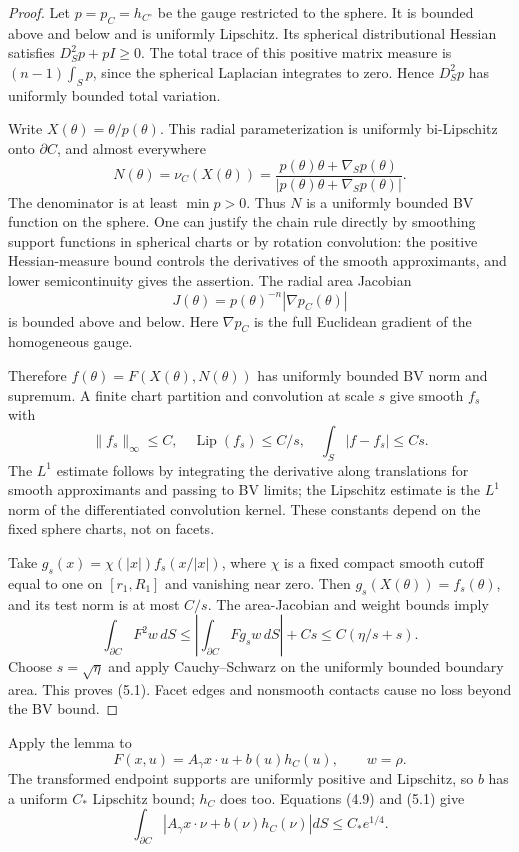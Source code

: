 \documentclass[11pt,reqno]{amsart}
\numberwithin{equation}{section}
\theoremstyle{remark}
\theoremstyle{definition}
\begin{document}
\begin{proof} Let \(p=p_C=h_{C^\circ}\) be the gauge restricted to the sphere. It is bounded above and below and is uniformly Lipschitz. Its spherical distributional Hessian satisfies
\(D_S^2p+pI\ge0\). The total trace of this positive matrix measure is
\((n-1)\int_Sp\), since the spherical Laplacian integrates to zero. Hence \(D_S^2p\) has uniformly bounded total variation.

Write \(X(\theta)=\theta/p(\theta)\). This radial parameterization is uniformly bi-Lipschitz onto \(\partial C\), and almost everywhere
\[
N(\theta)=\nu_C(X(\theta))
=\frac{p(\theta)\theta+\nabla_Sp(\theta)}
       {|p(\theta)\theta+\nabla_Sp(\theta)|}.
\]
The denominator is at least \(\min p>0\). Thus \(N\) is a uniformly bounded BV function on the sphere. One can justify the chain rule directly by smoothing support functions in spherical charts or by rotation convolution: the positive Hessian-measure bound controls the derivatives of the smooth approximants, and lower semicontinuity gives the assertion. The radial area Jacobian
\[
J(\theta)=p(\theta)^{-n}|\nabla p_C(\theta)|
\]
is bounded above and below. Here $\nabla p_C$ is the full Euclidean gradient of the homogeneous gauge.

Therefore \(f(\theta)=F(X(\theta),N(\theta))\) has uniformly bounded BV norm and supremum. A finite chart partition and convolution at scale \(s\) give smooth \(f_s\) with
\[
\|f_s\|_\infty\le C,\quad \operatorname{Lip}(f_s)\le C/s,\quad
\int_S|f-f_s|\le Cs.
\]
The \(L^1\) estimate follows by integrating the derivative along translations for smooth approximants and passing to BV limits; the Lipschitz estimate is the \(L^1\) norm of the differentiated convolution kernel. These constants depend on the fixed sphere charts, not on facets.

Take \(g_s(x)=\chi(|x|)f_s(x/|x|)\), where \(\chi\) is a fixed compact smooth cutoff equal to one on \([r_1,R_1]\) and vanishing near zero. Then \(g_s(X(\theta))=f_s(\theta)\), and its test norm is at most \(C/s\). The area-Jacobian and weight bounds imply
\[
\int_{\partial C}F^2w\,dS
\le\left|\int_{\partial C}Fg_sw\,dS\right|+Cs
\le C(\eta/s+s).
\]
Choose \(s=\sqrt\eta\) and apply Cauchy--Schwarz on the uniformly bounded boundary area. This proves (5.1). Facet edges and nonsmooth contacts cause no loss beyond the BV bound. \end{proof}

Apply the lemma to
\[
F(x,u)=A_\gamma x\cdot u+b(u)h_C(u),\qquad w=\rho.
\]
The transformed endpoint supports are uniformly positive and Lipschitz, so \(b\) has a uniform \(C_*\) Lipschitz bound; \(h_C\) does too. Equations (4.9) and (5.1) give
\[
\int_{\partial C}|A_\gamma x\cdot\nu+b(\nu)h_C(\nu)|dS
\le C_*e^{1/4}.                                       \tag{5.2}
\]
\end{document}
